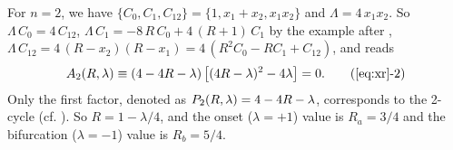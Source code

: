 \documentclass{ws-ijbc}
\begin{document}
For $n = 2$, we have %
$\{C_0, C_1, C_{12}\}
  = \{1,  x_1 + x_2, x_1 x_2 \}$
and
$\Lambda = 4 \, x_1 x_2$.
So
$\Lambda \, C_0 = 4 \, C_{12}$,
$\Lambda \, C_1 %
  = -8 \, R \, C_0 + 4 \, (R + 1) \, C_1$
by the example after ,
$\Lambda \, C_{12}
= 4 \, (R - x_2) (R - x_1) = 4 \, (R^2C_0-RC_1+C_{12})$,
and  reads
%
%
%
%
%
%
{\small
\begin{align}
A_2\Rlam \equiv (4 - 4R - \lambda)
  \left[
    (4 R-\lambda)^2 - 4 \lambda
  \right] = 0.
  \tag{\ref{eq:xr}-2}
\label{eq:xr2}
\end{align}
}
%
%
%
Only the first factor, denoted as $P_2(R, \lambda) = 4-4R -\lambda$,
  corresponds to the 2-cycle  (cf. ).
So $R = 1 - \lambda/4$,
and the onset ($\lambda = +1$) value is $R_a = 3/4$ %
and the bifurcation ($\lambda = -1$) value is $R_b = 5/4$. %
%
\end{document}
